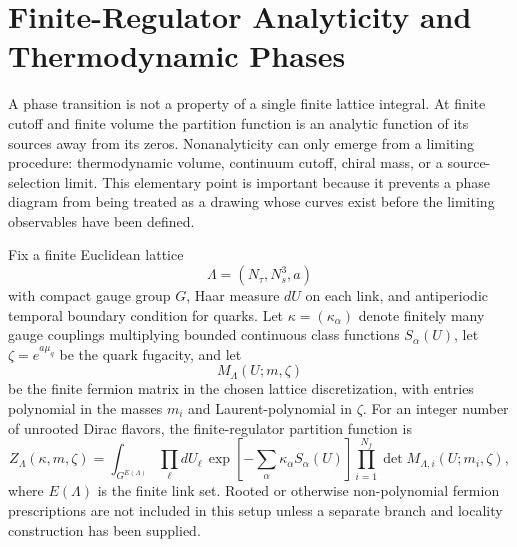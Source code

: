 \section{Finite-Regulator Analyticity and Thermodynamic Phases}
\label{sec:qcd-phase-finite-regulator-analyticity}

A phase transition is not a property of a single finite lattice integral.  At
finite cutoff and finite volume the partition function is an analytic
function of its sources away from its zeros.  Nonanalyticity can only emerge
from a limiting procedure: thermodynamic volume, continuum cutoff, chiral
mass, or a source-selection limit.  This elementary point is important
because it prevents a phase diagram from being treated as a drawing whose
curves exist before the limiting observables have been defined.

\begin{definition}
\label{def:qcd-finite-lattice-thermal-gauge-setup}
Fix a finite Euclidean lattice
\[
  \Lambda=(N_\tau,N_s^3,a)
\]
with compact gauge group \(G\), Haar measure \(dU\) on each link, and
antiperiodic temporal boundary condition for quarks.  Let
\(\kappa=(\kappa_\alpha)\) denote finitely many gauge couplings multiplying
bounded continuous class functions \(S_\alpha(U)\), let
\(\zeta=e^{a\mu_q}\) be the quark fugacity, and let
\[
  M_\Lambda(U;m,\zeta)
\]
be the finite fermion matrix in the chosen lattice discretization, with
entries polynomial in the masses \(m_i\) and Laurent-polynomial in \(\zeta\).
For an integer number of unrooted Dirac flavors, the finite-regulator
partition function is
\begin{equation}
  Z_\Lambda(\kappa,m,\zeta)
  =
  \int_{G^{E(\Lambda)}}\prod_{\ell}dU_\ell\,
  \exp\left[-\sum_\alpha \kappa_\alpha S_\alpha(U)\right]
  \prod_{i=1}^{N_f}\det M_{\Lambda,i}(U;m_i,\zeta),
  \label{eq:qcd-finite-lattice-partition-analytic}
\end{equation}
where \(E(\Lambda)\) is the finite link set.  Rooted or otherwise
non-polynomial fermion prescriptions are not included in this setup unless a
separate branch and locality construction has been supplied.
\end{definition}

